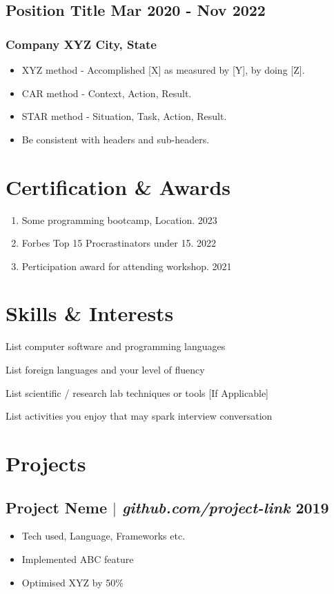 \documentclass[11pt]{article} %
\begin{document}
\subsection{Position Title \hfill Mar 2020 - Nov 2022}
\subsubsection{Company XYZ \hfill City, State}
\begin{itemize}
	\item XYZ method - Accomplished [X] as measured by [Y], by doing [Z].
	\item CAR method - Context, Action, Result. 
	\item STAR method - Situation, Task, Action, Result.
	\item Be consistent with headers and sub-headers. 
\end{itemize}

\section{Certification \& Awards}
\begin{enumerate}[label=\null, left=0pt..0pt, itemsep=0pt]
	\item Some programming bootcamp, Location. \hfill 2023
	\item Forbes Top 15 Procrastinators under 15. \hfill 2022
	\item Perticipation award for attending workshop. \hfill 2021
\end{enumerate}

\section{Skills \& Interests}
\begin{description}[itemsep=0pt]
	\item[Technical] List computer software and programming languages
	\item[Language] List foreign languages and your level of fluency
	\item[Laboratory] List scientific / research lab techniques or tools [If Applicable]
	\item[Interests] List activities you enjoy that may spark interview conversation
\end{description}

\section{Projects}
\subsection{Project Neme $|$ \normalfont\textit{github.com/project-link} \hfill 2019}
\begin{itemize}
  \item Tech used, Language, Frameworks etc.
  \item Implemented ABC feature
  \item Optimised XYZ by 50\%
\end{itemize}
\end{document}
